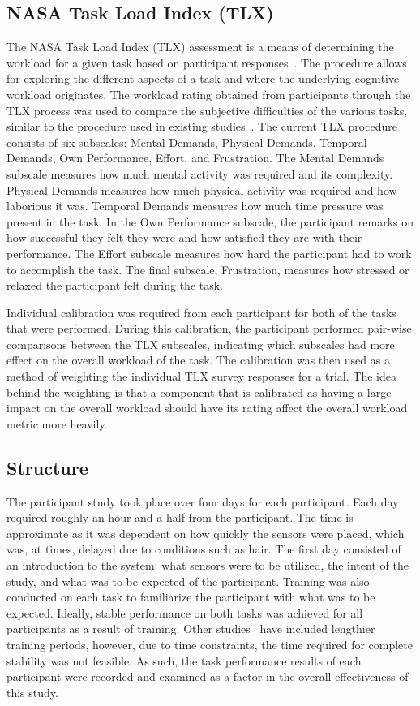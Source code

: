 \documentclass[11pt]{article}
\begin{document}
	\subsection{NASA Task Load Index (TLX)}
	The NASA Task Load Index (TLX) assessment is a means of determining the workload for a given task based on participant responses~\cite{NASA}. The procedure allows for exploring the different aspects of a task and where the underlying cognitive workload originates. The workload rating obtained from participants through the TLX process was used to compare the subjective difficulties of the various tasks, similar to the procedure used in existing studies~\cite{Ke, Estepp_2015}. The current TLX procedure consists of six subscales: Mental Demands, Physical Demands, Temporal Demands, Own Performance, Effort, and Frustration. The Mental Demands subscale measures how much mental activity was required and its complexity. Physical Demands measures how much physical activity was required and how laborious it was. Temporal Demands measures how much time pressure was present in the task. In the Own Performance subscale, the participant remarks on how successful they felt they were and how satisfied they are with their performance. The Effort subscale measures how hard the participant had to work to accomplish the task. The final subscale, Frustration, measures how stressed or relaxed the participant felt during the task. 
	
	Individual calibration was required from each participant for both of the tasks that were performed. During this calibration, the participant performed pair-wise comparisons between the TLX subscales, indicating which subscales had more effect on the overall workload of the task. The calibration was then used as a method of weighting the individual TLX survey responses for a trial. The idea behind the weighting is that a component that is calibrated as having a large impact on the overall workload should have its rating affect the overall workload metric more heavily.
		
	\subsection{Structure}
	The participant study took place over four days for each participant. Each day required roughly an hour and a half from the participant. The time is approximate as it was dependent on how quickly the sensors were placed, which was, at times, delayed due to conditions such as hair. The first day consisted of an introduction to the system: what sensors were to be utilized, the intent of the study, and what was to be expected of the participant. Training was also conducted on each task to familiarize the participant with what was to be expected. Ideally, stable performance on both tasks was achieved for all participants as a result of training. Other studies~\cite{Wilson} have included lengthier training periods, however, due to time constraints, the time required for complete stability was not feasible. 
	As such, the task performance results of each participant were recorded and examined as a factor in the overall effectiveness of this study. 
		
\end{document}
